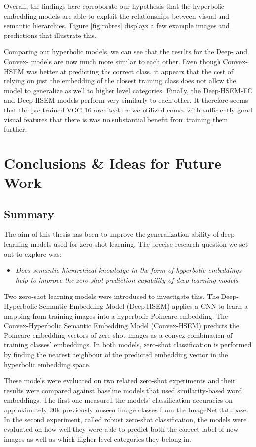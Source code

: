 \documentclass[12pt]{report}
\begin{document}
Overall, the findings here corroborate our hypothesis that the hyperbolic embedding models are able to exploit the relationships between visual and semantic hierarchies. Figure \ref{fig:robres} displays a few example images and predictions that illustrate this.

Comparing our hyperbolic models, we can see that the results for the Deep- and Convex- models are now much more similar to each other. Even though Convex-HSEM was better at predicting the correct class, it appears that the cost of relying on just the embedding of the closest training class does not allow the model to generalize as well to higher level categories. Finally, the Deep-HSEM-FC and Deep-HSEM models perform very similarly to each other. It therefore seems that the pre-trained VGG-16 architecture we utilized comes with sufficiently good visual features that there is was no substantial benefit from training them further.

\newpage
\chapter{Conclusions \& Ideas for Future Work}

\section{Summary}
The aim of this thesis has been to improve the generalization ability of deep learning models used for zero-shot learning. The precise research question we set out to explore was: 
\begin{itemize}
\item \textit{Does semantic hierarchical knowledge in the form of hyperbolic embeddings help to improve the zero-shot prediction capability of deep learning models}
\end{itemize}
Two zero-shot learning models were introduced to investigate this. The Deep-Hyperbolic Semantic Embedding Model (Deep-HSEM) applies a CNN to learn a mapping from training images into a hyperbolic Poincare embedding. The Convex-Hyperbolic Semantic Embedding Model (Convex-HSEM) predicts the Poincare embedding vectors of zero-shot images as a convex combination of training classes' embeddings. In both models, zero-shot classification is performed by finding the nearest neighbour of the predicted embedding vector in the hyperbolic embedding space.

These models were evaluated on two related zero-shot experiments and their results were compared against baseline models that used similarity-based word embeddings. The first one measured the models' classification accuracies on approximately 20k previously unseen image classes from the ImageNet database. In the second experiment, called robust zero-shot classification, the models were evaluated on how well they were able to predict both the correct label of new images as well as which higher level categories they belong in.
\end{document}
